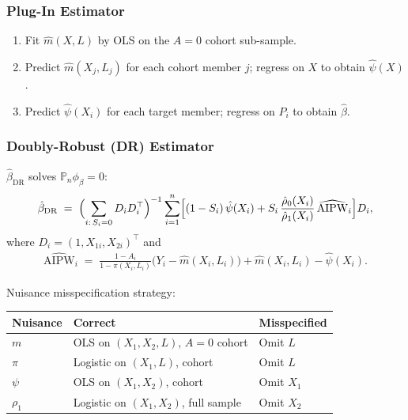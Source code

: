 \subsubsection*{Plug-In Estimator}

\begin{enumerate}
  \item Fit $\hat{m}(X,L)$ by OLS on the $A=0$ cohort sub-sample.
  \item Predict $\hat{m}(X_j,L_j)$ for each cohort member $j$; regress on $X$
        to obtain $\hat\psi(X)$.
  \item Predict $\hat\psi(X_i)$ for each target member; regress on $P_i$ to
        obtain $\hat\beta$.
\end{enumerate}

\subsubsection*{Doubly-Robust (DR) Estimator}

$\hat\beta_{\mathrm{DR}}$ solves $\mathbb{P}_n\phi_\beta = 0$:
\begin{align}
  \hat\beta_{\mathrm{DR}}
  \;=\;
  \Bigl(\sum_{i:\,S_i=0} D_i D_i^\top\Bigr)^{-1}
  \sum_{i=1}^n
  \Bigl[
    (1-S_i)\,\hat\psi(X_i)
    + S_i\,\frac{\hat\rho_0(X_i)}{\hat\rho_1(X_i)}\,\widehat{\mathrm{AIPW}}_i
  \Bigr] D_i,
\end{align}
where $D_i = (1, X_{1i}, X_{2i})^\top$ and
\begin{align}
  \widehat{\mathrm{AIPW}}_i
  \;=\;
  \frac{1-A_i}{1-\hat\pi(X_i,L_i)}\bigl(Y_i - \hat m(X_i,L_i)\bigr)
  + \hat m(X_i,L_i) - \hat\psi(X_i).
\end{align}

Nuisance misspecification strategy:

\begin{center}
\begin{tabular}{lll}
  \toprule
  \textbf{Nuisance} & \textbf{Correct} & \textbf{Misspecified} \\
  \midrule
  $m$      & OLS on $(X_1, X_2, L)$, $A=0$ cohort & Omit $L$ \\
  $\pi$    & Logistic on $(X_1, L)$, cohort        & Omit $L$ \\
  $\psi$   & OLS on $(X_1, X_2)$, cohort           & Omit $X_1$ \\
  $\rho_1$ & Logistic on $(X_1, X_2)$, full sample & Omit $X_2$ \\
  \bottomrule
\end{tabular}
\end{center}

